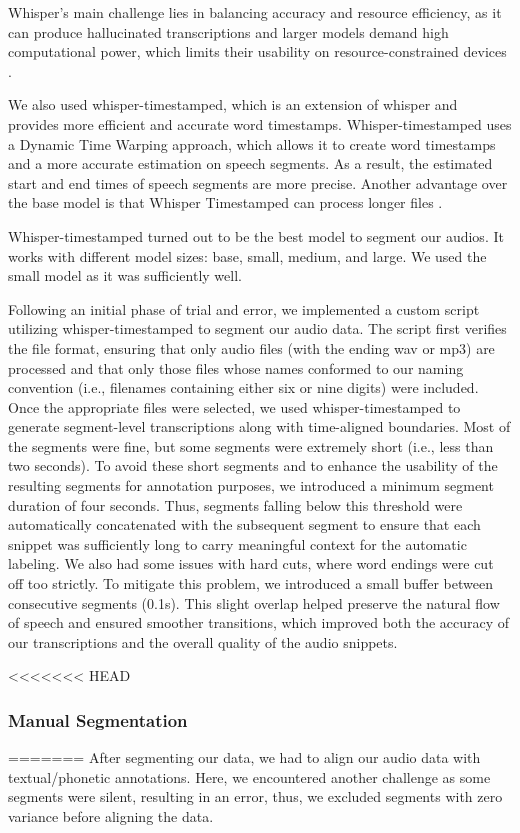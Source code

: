 \documentclass[a4paper]{article}
\begin{document}
Whisper's main challenge lies in balancing accuracy and resource efficiency, as it can produce hallucinated transcriptions and larger models demand high computational power, which limits their usability on resource-constrained devices \cite{Andreyev2025}.

We also used whisper-timestamped, which is an extension of whisper and provides more efficient and accurate word timestamps. Whisper-timestamped uses a Dynamic Time Warping approach, which allows it to create word timestamps and a more accurate estimation on speech segments. As a result, the estimated start and end times of speech segments are more precise. Another advantage over the base model is that Whisper Timestamped can process longer files \cite{Andreyev2025}.

Whisper-timestamped turned out to be the best model to segment our audios. It works with different model sizes: base, small, medium, and large. We used the small model as it was sufficiently well.

Following an initial phase of trial and error, we implemented a custom script utilizing whisper-timestamped to segment our audio data. The script first verifies the file format, ensuring that only audio files (with the ending wav or mp3) are processed and that only those files whose names conformed to our naming convention (i.e., filenames containing either six or nine digits) were included. Once the appropriate files were selected, we used whisper-timestamped to generate segment-level transcriptions along with time-aligned boundaries. Most of the segments were fine, but some segments were extremely short (i.e., less than two seconds). To avoid these short segments and to enhance the usability of the resulting segments for annotation purposes, we introduced a minimum segment duration of four seconds. Thus, segments falling below this threshold were automatically concatenated with the subsequent segment to ensure that each snippet was sufficiently long to carry meaningful context for the automatic labeling. We also had some issues with hard cuts, where word endings were cut off too strictly. To mitigate this problem, we introduced a small buffer between consecutive segments (0.1s). This slight overlap helped preserve the natural flow of speech and ensured smoother transitions, which improved both the accuracy of our transcriptions and the overall quality of the audio snippets.

<<<<<<< HEAD
\subsubsection{Manual Segmentation}
=======
After segmenting our data, we had to align our audio data with textual/phonetic annotations. Here, we encountered another challenge as some segments were silent, resulting in an error, thus, we excluded segments with zero variance before aligning the data.
\end{document}
